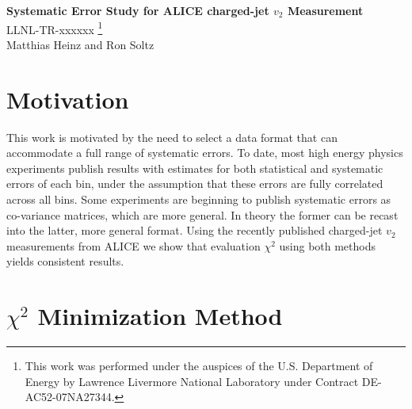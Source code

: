 \documentclass[11pt]{article}
\begin{document}
\renewcommand{\textfraction}{0.1}
\renewcommand{\topfraction}{0.9}
\renewcommand{\bottomfraction}{0.9}
\renewcommand{\floatpagefraction}{0.1}

\begin{center}
{\Large \bf Systematic Error Study for ALICE charged-jet $v_2$ Measurement}\\
\bigskip
LLNL-TR-xxxxxx
\footnote{This work was performed under the auspices of the U.S. Department of Energy by Lawrence Livermore National Laboratory under Contract DE-AC52-07NA27344.}
\\
\bigskip
Matthias Heinz and Ron Soltz
\end{center}

\begin{abstract}
We study the treatment of systematic errors in the determination of $v_2$ for charged jets in $\sqrt{s_{NN}}=2.76$~TeV Pb-Pb collisions by the ALICE Collaboration~\cite{Adam:2016ix}.  Working with the reported values and errors for the 0-5\% centrality data we evaluate the $\chi^2$ according to the formulas given for the statistical and systematic errors, where the latter are separated into correlated and shape contributions.  We reproduce both the $\chi^2$ and $p$-values relative to a null (zero) result.  We then re-cast the systematic errors into an equivalent co-variance matrix and obtain identical results, demonstrating that the two methods are equivalent. 
\end{abstract}

\section{Motivation}

This work is motivated by the need to select a data format that can accommodate a full range of systematic errors.  To date, most high energy physics experiments publish results with estimates for both statistical and systematic errors of each bin, under the assumption that these errors are fully correlated across all bins.  Some experiments are beginning to publish systematic errors as co-variance matrices, which are more general.  In theory the former can be recast into the latter, more general format.  Using the recently published charged-jet $v_2$ measurements from ALICE we show that evaluation $\chi^2$ using both methods yields consistent results.

\section{$\chi^2$ Minimization Method}
\end{document}
